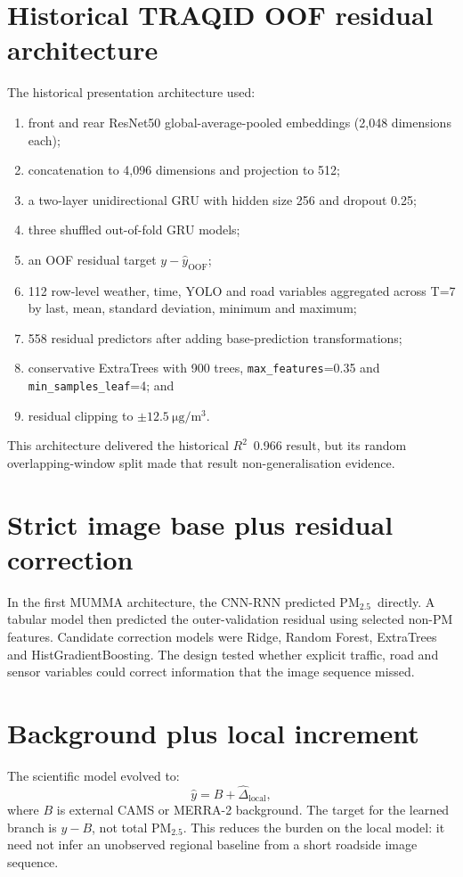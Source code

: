 \documentclass[11pt,a4paper,oneside]{report}
\newcommand{\pmtwo}{PM$_{2.5}$}
\newcommand{\Rtwo}{$R^2$}
\begin{document}
\section{Historical TRAQID OOF residual architecture}
The historical presentation architecture used:
\begin{enumerate}
  \item front and rear ResNet50 global-average-pooled embeddings
        (2,048 dimensions each);
  \item concatenation to 4,096 dimensions and projection to 512;
  \item a two-layer unidirectional GRU with hidden size 256 and dropout 0.25;
  \item three shuffled out-of-fold GRU models;
  \item an OOF residual target $y-\hat y_{\mathrm{OOF}}$;
  \item 112 row-level weather, time, YOLO and road variables aggregated across
        T=7 by last, mean, standard deviation, minimum and maximum;
  \item 558 residual predictors after adding base-prediction transformations;
  \item conservative ExtraTrees with 900 trees, \texttt{max\_features}=0.35 and
        \texttt{min\_samples\_leaf}=4; and
  \item residual clipping to $\pm\SI{12.5}{\micro\gram\per\cubic\metre}$.
\end{enumerate}
This architecture delivered the historical \Rtwo\ 0.966 result, but its random
overlapping-window split made that result non-generalisation evidence.

\section{Strict image base plus residual correction}
In the first MUMMA architecture, the CNN-RNN predicted \pmtwo\ directly. A tabular
model then predicted the outer-validation residual using selected non-PM
features. Candidate correction models were Ridge, Random Forest, ExtraTrees and
HistGradientBoosting. The design tested whether explicit traffic, road and
sensor variables could correct information that the image sequence missed.

\section{Background plus local increment}
The scientific model evolved to:
\begin{equation}
  \hat y = B + \hat\Delta_{\mathrm{local}},
  \label{eq:backgroundlocal}
\end{equation}
where $B$ is external CAMS or MERRA-2 background. The target for the learned
branch is $y-B$, not total \pmtwo. This reduces the burden on the local model: it
need not infer an unobserved regional baseline from a short roadside image
sequence.
\end{document}
